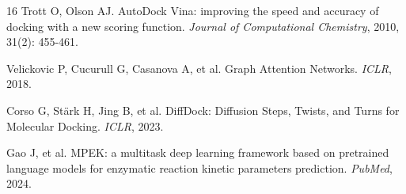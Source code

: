 \documentclass[11pt]{article}
\begin{document}
\begin{thebibliography}{16}
Trott O, Olson AJ. AutoDock Vina: improving the speed and accuracy of docking with a new scoring function. \textit{Journal of Computational Chemistry}, 2010, 31(2): 455-461.

Velickovic P, Cucurull G, Casanova A, et al. Graph Attention Networks. \textit{ICLR}, 2018.

Corso G, Stärk H, Jing B, et al. DiffDock: Diffusion Steps, Twists, and Turns for Molecular Docking. \textit{ICLR}, 2023.

Gao J, et al. MPEK: a multitask deep learning framework based on pretrained language models for enzymatic reaction kinetic parameters prediction. \textit{PubMed}, 2024.

\end{thebibliography}
\end{document}
